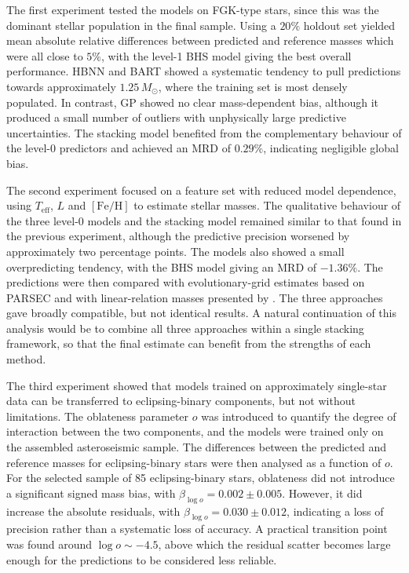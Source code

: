 The first experiment tested the models on FGK-type stars, since this was the dominant stellar population in the final sample. Using a $20\%$ holdout set yielded mean absolute relative differences between predicted and reference masses which were all close to $5\%$, with the level-1 BHS model giving the best overall performance. HBNN and BART showed a systematic tendency to pull predictions towards approximately $1.25\,M_\odot$, where the training set is most densely populated. In contrast, GP showed no clear mass-dependent bias, although it produced a small number of outliers with unphysically large predictive uncertainties. The stacking model benefited from the complementary behaviour of the level-0 predictors and achieved an MRD of $0.29\%$, indicating negligible global bias.

The second experiment focused on a feature set with reduced model dependence, using $T_{\mathrm{eff}}$, $L$ and $[\mathrm{Fe}/\mathrm{H}]$ to estimate stellar masses. The qualitative behaviour of the three level-0 models and the stacking model remained similar to that found in the previous experiment, although the predictive precision worsened by approximately two percentage points. The models also showed a small overpredicting tendency, with the BHS model giving an MRD of $-1.36\%$. The predictions were then compared with evolutionary-grid estimates based on PARSEC \citep{bressan2012} and with linear-relation masses presented by \citet{moya2018}. The three approaches gave broadly compatible, but not identical results. A natural continuation of this analysis would be to combine all three approaches within a single stacking framework, so that the final estimate can benefit from the strengths of each method.

The third experiment showed that models trained on approximately single-star data can be transferred to eclipsing-binary components, but not without limitations. The oblateness parameter $o$ was introduced to quantify the degree of interaction between the two components, and the models were trained only on the assembled asteroseismic sample. The differences between the predicted and reference masses for eclipsing-binary stars were then analysed as a function of $o$. For the selected sample of 85 eclipsing-binary stars, oblateness did not introduce a significant signed mass bias, with $\beta_{\log o} = 0.002 \pm 0.005$. However, it did increase the absolute residuals, with $\beta_{\log o} = 0.030 \pm 0.012$, indicating a loss of precision rather than a systematic loss of accuracy. A practical transition point was found around $\log o \sim -4.5$, above which the residual scatter becomes large enough for the predictions to be considered less reliable.

